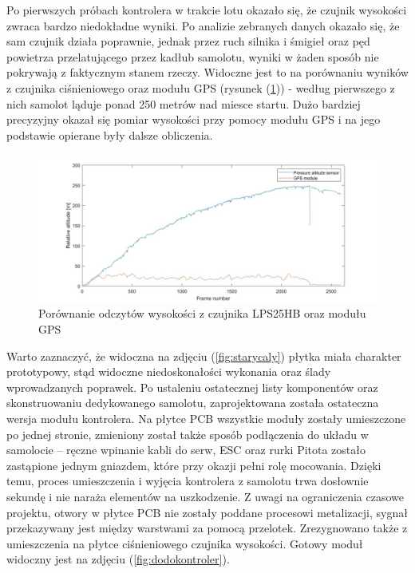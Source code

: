 \documentclass[12pt, a4paper]{article}
\let\oldref\ref
\renewcommand{\ref}[1]{(\oldref{#1})}
\begin{document}
Po pierwszych próbach kontrolera w trakcie lotu okazało się, że czujnik wysokości zwraca bardzo niedokładne wyniki. Po analizie zebranych danych okazało się, że sam czujnik działa poprawnie, jednak przez ruch silnika i śmigieł oraz pęd powietrza przelatującego przez kadłub samolotu, wyniki w żaden sposób nie pokrywają z faktycznym stanem rzeczy. Widoczne jest to na porównaniu wyników z czujnika ciśnieniowego oraz modułu GPS (rysunek \ref{fig:alti}) - według pierwszego z nich samolot ląduje ponad 250 metrów nad miesce startu. Dużo bardziej precyzyjny okazał się pomiar wysokości przy pomocy modułu GPS i na jego podstawie opierane były dalsze obliczenia.

\begin{figure}[ht]
    \centering
    \includegraphics[width=1\textwidth]{alti}
    \caption{Porównanie odczytów wysokości z czujnika LPS25HB oraz modułu GPS}
    \label{fig:alti}
\end{figure}

Warto zaznaczyć, że widoczna na zdjęciu \ref{fig:starycaly} płytka miała charakter prototypowy, stąd widoczne niedoskonałości wykonania oraz ślady wprowadzanych poprawek. Po ustaleniu ostatecznej listy komponentów oraz skonstruowaniu dedykowanego samolotu, zaprojektowana została ostateczna wersja modułu kontrolera. Na płytce PCB wszystkie moduły zostały umieszczone po jednej stronie, zmieniony został także sposób podłączenia do układu w samolocie – ręczne wpinanie kabli do serw, ESC oraz rurki Pitota zostało zastąpione jednym gniazdem, które przy okazji pełni rolę mocowania. Dzięki temu, proces umieszczenia i wyjęcia kontrolera z samolotu trwa dosłownie sekundę i nie naraża elementów na uszkodzenie. Z uwagi na ograniczenia czasowe projektu, otwory w płytce PCB nie zostały poddane procesowi metalizacji, sygnał przekazywany jest między warstwami za pomocą przelotek. Zrezygnowano także z umieszczenia na płytce ciśnieniowego czujnika wysokości. Gotowy moduł widoczny jest na zdjęciu \ref{fig:dodokontroler}.
\end{document}
